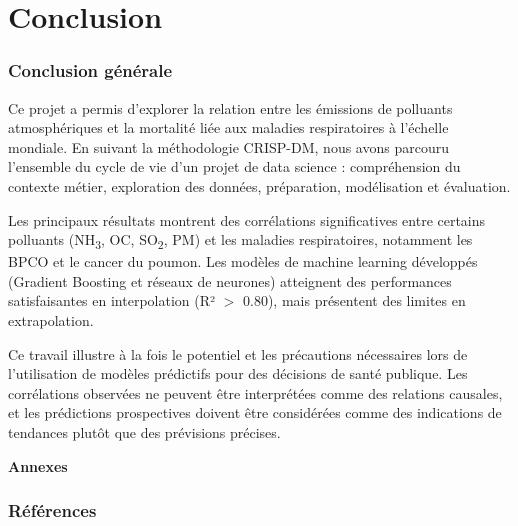 \documentclass[11pt,a4paper]{article}
\newcommand{\currentpart}{}
\let\oldpart\part
\renewcommand{\part}[1]{%
  \oldpart{#1}%
  \renewcommand{\currentpart}{\thepart.\ #1}%
  \markboth{\currentpart}{}%
}
\begin{document}
\clearpage
\part{Conclusion}
\section{Conclusion générale}

Ce projet a permis d'explorer la relation entre les émissions de polluants atmosphériques et la mortalité liée aux maladies respiratoires à l'échelle mondiale. En suivant la méthodologie CRISP-DM, nous avons parcouru l'ensemble du cycle de vie d'un projet de data science : compréhension du contexte métier, exploration des données, préparation, modélisation et évaluation.

Les principaux résultats montrent des corrélations significatives entre certains polluants (NH\textsubscript{3}, OC, SO\textsubscript{2}, PM) et les maladies respiratoires, notamment les BPCO et le cancer du poumon. Les modèles de machine learning développés (Gradient Boosting et réseaux de neurones) atteignent des performances satisfaisantes en interpolation (R² $>$ 0.80), mais présentent des limites en extrapolation.

Ce travail illustre à la fois le potentiel et les précautions nécessaires lors de l'utilisation de modèles prédictifs pour des décisions de santé publique. Les corrélations observées ne peuvent être interprétées comme des relations causales, et les prédictions prospectives doivent être considérées comme des indications de tendances plutôt que des prévisions précises.


\clearpage
\appendix
{}
\setcounter{page}{1}

{}
\begin{center}
{\Huge\bfseries Annexes}
\end{center}

{}
\section*{Références}
\end{document}
